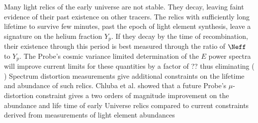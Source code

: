 Many light relics of the early universe are not stable. They decay, 
leaving faint evidence of their past existence on other tracers. The relics with sufficiently long lifetime to survive few minutes, 
past the epoch of light element synthesis, leave a signature on the helium fraction $Y_p$.  If they decay 
by the time of recombination, their existence through this period is best measured through the ratio of $\Neff$ to $Y_p$. 
The Probe's cosmic variance limited determination 
of the $E$ power spectra will improve current limits for these quantities by a factor of ?? thus eliminating ( )
Spectrum distortion measurements give additional constraints on the lifetime and abundance 
of such relics. Chluba et al. showed that a future Probe's $\mu$-distortion constraint gives a two orders of magnitude
improvement on the abundance and life time of early Universe relics compared to current constraints derived 
from measurements of light element abundances 



